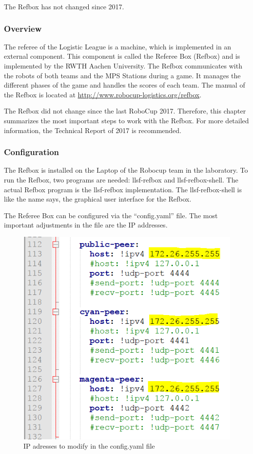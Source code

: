 The Refbox has not changed since 2017. 


\subsubsection{Overview}

The referee of the Logistic League is a machine, which is implemented in an external component. This component is called the Referee Box (Refbox) and is implemented by the RWTH Aachen University. The Refbox communicates with the robots of both teams and the MPS Stations during a game. It manages the different phases of the game and handles the scores of each team. The manual of the Refbox is located at  \url{http://www.robocup-logistics.org/refbox}.

The Refbox did not change since the last RoboCup 2017. Therefore, this chapter summarizes the most important steps to work with the Refbox. For more detailed information, the Technical Report of 2017 \cite{TR17} is recommended.


\subsubsection{Configuration}

The Refbox is installed on the Laptop of the Robocup team in the laboratory. To run the Refbox, two programs are needed: llsf-refbox and llsf-refbox-shell. The actual Refbox program is the llsf-refbox implementation. The llsf-refbox-shell is like the name says, the graphical user interface for the Refbox.

The Referee Box can be configured via the “config.yaml” file. The most important adjustments in the file are the IP addresses. 
 
 \begin{figure}[!h]
\centering
\includegraphics[]{pic/config_file_1.png}
\caption{IP adresses to modify in the config.yaml file}
\label{fig:configFile1}
\end{figure}

